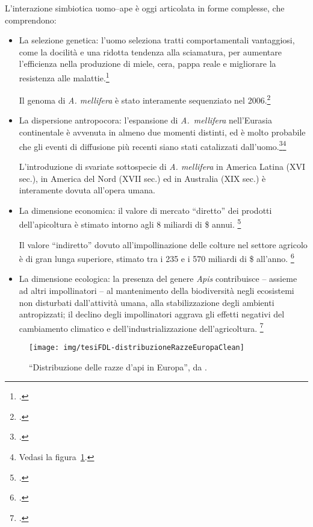 L'interazione simbiotica uomo--ape è oggi articolata in forme complesse, che comprendono:
\begin{itemize}
    \item La selezione genetica: l'uomo seleziona tratti comportamentali vantaggiosi, come la docilità e una ridotta
        tendenza alla sciamatura, per aumentare l’efficienza nella produzione di miele, cera, pappa reale
        e migliorare la resistenza alle malattie.\footcite{behavGenetics,algerianHoney}

        Il genoma di \emph{A. mellifera} è stato interamente sequenziato nel 2006.\footcite{genomeSeq}
    \item La dispersione antropocora: l'espansione di \emph{A.~mellifera} nell'Eurasia continentale è avvenuta in
        almeno due momenti distinti, ed è molto probabile che gli eventi di diffusione più recenti
        siano stati catalizzati dall'uomo.\footcite{antropocora}\footnote{Vedasi la figura~\ref{img:europ}.}

        L'introduzione di svariate sottospecie di \emph{A. mellifera} in America Latina (XVI sec.), in America
        del Nord (XVII sec.) ed in Australia (XIX sec.) è interamente dovuta all'opera umana.
    \item La dimensione economica: il valore di mercato ``diretto'' dei prodotti dell'apicoltura è stimato intorno agli 8 miliardi di \$ annui. \footcite{honeymarket1}

        Il valore ``indiretto'' dovuto all'impollinazione delle colture nel settore agricolo è di gran lunga superiore, stimato tra i 235 e i 570 miliardi di \$ all'anno. \footcite{honeymarket2,honeymarket3}
    \item La dimensione ecologica: la presenza del genere \emph{Apis} contribuisce -- assieme ad altri impollinatori -- al mantenimento della biodiversità negli ecosistemi non disturbati dall'attività umana, alla stabilizzazione degli ambienti antropizzati; il declino degli impollinatori aggrava gli effetti negativi del cambiamento climatico e dell'industrializzazione dell'agricoltura. \footcite{decline}
\end{itemize}

\begin{figure}
    \centering
    \texttt{[image: img/tesiFDL-distribuzioneRazzeEuropaClean]}

    \caption[Distribuzione delle razze d'api in Europa]{``Distribuzione
    delle razze d'api in Europa'', da \cite[24]{tesiFDL}.}
    \label{img:europ}
\end{figure}

